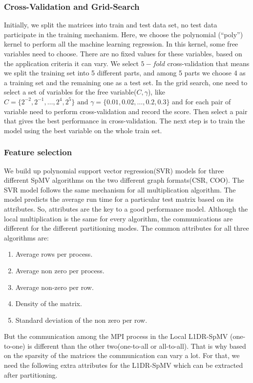 \documentclass[sigconf,review,anonymous]{acmart}
\begin{document}
\subsubsection{Cross-Validation and Grid-Search}
Initially, we split the matrices into train and test data set, no test
data participate in the training mechanism. Here, we choose the
polynomial (``poly'') kernel to perform all the machine learning
regression. In this kernel, some free variables need to choose. 
There are no fixed values for these variables, based on the
application criteria it can vary. We select $5-fold$ cross-validation
that means we split the training set into 5 different parts, and among
5 parts we choose 4 as a training set and the remaining one as a test
set. In the grid search, one need to select a set of variables for the
free variable($C,\gamma$), like $C=\{2^{-2},
2^{-1}, \dots, 2^4, 2^5\}\text{ and }\gamma=\{0.01, 0.02, \dots, 0.2, 0.3\}$
and for each pair of variable need to perform cross-validation and
record the score. Then select a pair that gives the best performance
in cross-validation.  The next step is to train the model using the best
variable on the whole train set.

\subsubsection{Feature selection}
We build up polynomial support vector regression(SVR) models for three
different SpMV algorithms on the two different graph formats(CSR,
COO).  The SVR model follows the same mechanism for all multiplication
algorithm. The model predicts the average run time for a particular
test matrix based on its attributes. So, attributes are the key to a
good performance model.  Although the local multiplication is the same
for every algorithm, the communications are different for the
different partitioning modes. The common attributes for all three
algorithms are:

\begin{enumerate}
\label{list:static-attributes}
\item Average rows per process.
\item Average non zero per process.
\item Average non-zero per row.
\item Density of the matrix.
\item Standard deviation of the non zero per row.
\end{enumerate}

But the communication among the MPI process in the Local L1DR-SpMV
(one-to-one) is different than the other two(one-to-all or all-to-all).
That is why based on the sparsity of the matrices the communication
can vary a lot. For that, we need the following extra attributes for
the L1DR-SpMV which can be extracted after partitioning.
\end{document}
